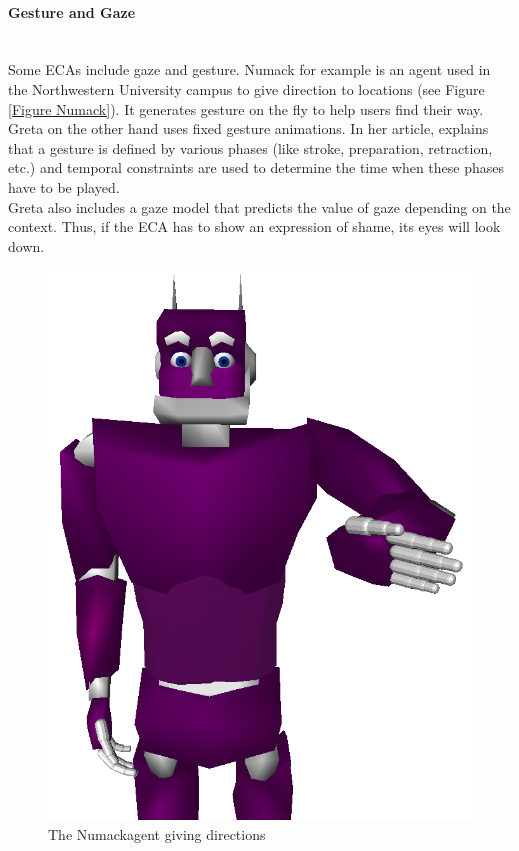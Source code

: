 \documentclass[11pt]{article}
\begin{document}
\paragraph{Gesture and Gaze}\mbox{}\\
Some ECAs include gaze and gesture. Numack \citep{Cassell07} for example is an agent used in the Northwestern University campus to give direction to locations (see Figure \ref{Figure Numack}). It generates gesture on the fly to help users find their way. Greta \citep{Pelachaud05} on the other hand uses fixed gesture animations. In her article, \citeauthor{Pelachaud05} explains that a gesture is defined by various phases (like stroke, preparation, retraction, etc.) and temporal constraints are used to determine the time when these phases have to be played.\\
Greta \citep{Pelachaud05} also includes a gaze model that predicts the value of gaze depending on the context. Thus, if the ECA has to show an expression of shame, its eyes will look down.\mbox{} 
\begin{figure}[!h]
   \centering
   \includegraphics[scale=0.18]{./images/numack}
   \caption[Caption for NUMACK]{The Numack\protect\footnotemark  agent giving directions}
\end{figure}
\end{document}
